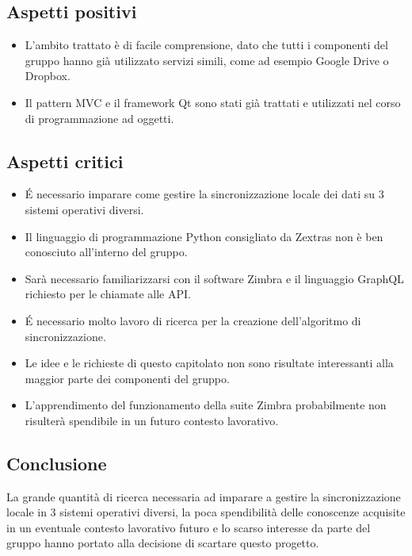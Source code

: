 \subsection{Aspetti positivi}
\begin{itemize}
\item L'ambito trattato è di facile comprensione, dato che tutti i componenti del gruppo hanno già utilizzato servizi simili, come ad esempio Google Drive o Dropbox.
\item Il pattern MVC e il framework Qt sono stati già trattati e utilizzati nel corso di programmazione ad oggetti.
\end{itemize}

\subsection{Aspetti critici}
\begin{itemize}
\item É necessario imparare come gestire la sincronizzazione locale dei dati su 3 sistemi operativi diversi.
\item Il linguaggio di programmazione Python consigliato da Zextras non è ben conosciuto all'interno del gruppo.
\item Sarà necessario familiarizzarsi con il software Zimbra e il linguaggio GraphQL richiesto per le chiamate alle API.
\item É necessario molto lavoro di ricerca per la creazione dell'algoritmo di sincronizzazione.
\item Le idee e le richieste di questo capitolato non sono risultate interessanti alla maggior parte dei componenti del gruppo.
\item L'apprendimento del funzionamento della suite Zimbra probabilmente non risulterà spendibile in un futuro contesto lavorativo.
\end{itemize}

\subsection{Conclusione}
La grande quantità di ricerca necessaria ad imparare a gestire la sincronizzazione locale in 3 sistemi operativi diversi, la poca spendibilità delle conoscenze acquisite in un eventuale contesto lavorativo futuro e lo scarso interesse da parte del gruppo hanno portato alla decisione di scartare questo progetto.

